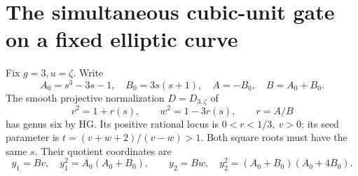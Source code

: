 \section{The simultaneous cubic-unit gate on a fixed elliptic curve}
\label{ssg-section}
Fix \(g=3,u=\zeta\). Write
\[
 A_0=s^3-3s-1,\quad B_0=3s(s+1),\quad A=-B_0,\quad B=A_0+B_0.
\]
The smooth projective normalization \(D=D_{3,\zeta}\) of
\begin{equation}\label{ssg-source}
 v^2=1+r(s),\qquad w^2=1-3r(s),\qquad r=A/B
\end{equation}
has genus six by HG. Its positive rational locus is
\(0<r<1/3,\ v>0\); its seed parameter is \(t=(v+w+2)/(v-w)>1\).
Both square roots must have the same \(s\). Their quotient coordinates are
\[
 y_1=Bv,\quad y_1^2=A_0(A_0+B_0),\qquad
 y_2=Bw,\quad y_2^2=(A_0+B_0)(A_0+4B_0).
\]

